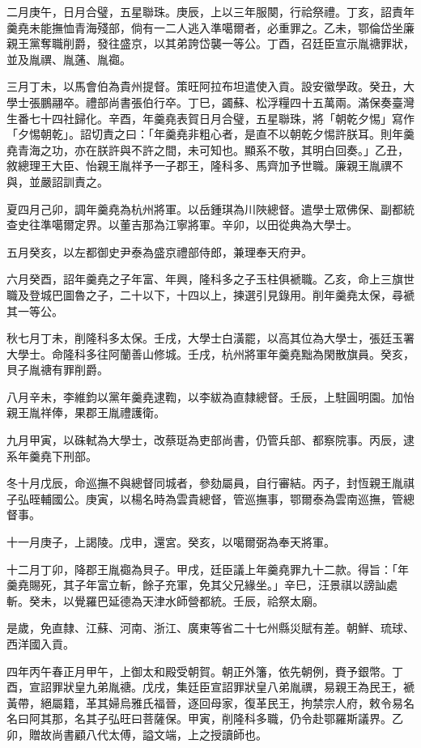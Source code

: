 \begin{pinyinscope}
二月庚午，日月合璧，五星聯珠。庚辰，上以三年服闋，行祫祭禮。丁亥，詔責年羹堯未能撫恤青海殘部，倘有一二人逃入準噶爾者，必重罪之。乙未，鄂倫岱坐廉親王黨奪職削爵，發往盛京，以其弟誇岱襲一等公。丁酉，召廷臣宣示胤禟罪狀，並及胤禩、胤蓪、胤禵。

三月丁未，以馬會伯為貴州提督。策旺阿拉布坦遣使入貢。設安徽學政。癸丑，大學士張鵬翮卒。禮部尚書張伯行卒。丁巳，蠲蘇、松浮糧四十五萬兩。滿保奏臺灣生番七十四社歸化。辛酉，年羹堯表賀日月合璧，五星聯珠，將「朝乾夕惕」寫作「夕惕朝乾」。詔切責之曰：「年羹堯非粗心者，是直不以朝乾夕惕許朕耳。則年羹堯青海之功，亦在朕許與不許之間，未可知也。顯系不敬，其明白回奏。」乙丑，敘總理王大臣、怡親王胤祥予一子郡王，隆科多、馬齊加予世職。廉親王胤禩不與，並嚴詔訓責之。

夏四月己卯，調年羹堯為杭州將軍。以岳鍾琪為川陜總督。遣學士眾佛保、副都統查史往準噶爾定界。以董吉那為江寧將軍。辛卯，以田從典為大學士。

五月癸亥，以左都御史尹泰為盛京禮部侍郎，兼理奉天府尹。

六月癸酉，詔年羹堯之子年富、年興，隆科多之子玉柱俱褫職。乙亥，命上三旗世職及登城巴圖魯之子，二十以下，十四以上，揀選引見錄用。削年羹堯太保，尋褫其一等公。

秋七月丁未，削隆科多太保。壬戌，大學士白潢罷，以高其位為大學士，張廷玉署大學士。命隆科多往阿蘭善山修城。壬戌，杭州將軍年羹堯黜為閑散旗員。癸亥，貝子胤禟有罪削爵。

八月辛未，李維鈞以黨年羹堯逮鞫，以李紱為直隸總督。壬辰，上駐圓明園。加怡親王胤祥俸，果郡王胤禮護衛。

九月甲寅，以硃軾為大學士，改蔡珽為吏部尚書，仍管兵部、都察院事。丙辰，逮系年羹堯下刑部。

冬十月戊辰，命巡撫不與總督同城者，參劾屬員，自行審結。丙子，封恆親王胤祺子弘晊輔國公。庚寅，以楊名時為雲貴總督，管巡撫事，鄂爾泰為雲南巡撫，管總督事。

十一月庚子，上謁陵。戊申，還宮。癸亥，以噶爾弼為奉天將軍。

十二月丁卯，降郡王胤禵為貝子。甲戌，廷臣議上年羹堯罪九十二款。得旨：「年羹堯賜死，其子年富立斬，餘子充軍，免其父兄緣坐。」辛巳，汪景祺以謗訕處斬。癸未，以覺羅巴延德為天津水師營都統。壬辰，祫祭太廟。

是歲，免直隸、江蘇、河南、浙江、廣東等省二十七州縣災賦有差。朝鮮、琉球、西洋國入貢。

四年丙午春正月甲午，上御太和殿受朝賀。朝正外籓，依先朝例，賚予銀幣。丁酉，宣詔罪狀皇九弟胤禟。戊戌，集廷臣宣詔罪狀皇八弟胤禩，易親王為民王，褫黃帶，絕屬籍，革其婦烏雅氏福晉，逐回母家，復革民王，拘禁宗人府，敕令易名名曰阿其那，名其子弘旺曰菩薩保。甲寅，削隆科多職，仍令赴鄂羅斯議界。乙卯，贈故尚書顧八代太傅，謚文端，上之授讀師也。


\end{pinyinscope}
